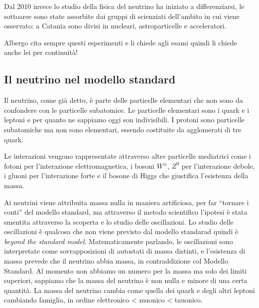         Dal 2010 invece lo studio della fisica del neutrino ha iniziato a differenziarsi, le sottoaree sono state assorbite dai gruppi di scienziati dell'ambito in cui viene osservato: a Catania sono divisi in nucleari, astroparticelle e acceleratori.

        Albergo cita sempre questi esperimenti e li chiede agli esami quindi li chiede anche lei per continuità!
    \subsection{Il neutrino nel modello standard}
        Il neutrino, come già detto, è parte delle particelle elementari che non sono da confondere con le particelle subatomice. Le particelle elementari sono i quark e i leptoni e per quanto ne sappiamo oggi son indivisibili. I protoni sono particelle subatomiche ma non sono elementari, essendo costituite da agglomerati di tre quark.

        Le interazioni vengono rappresentate attraverso altre particelle mediatrici come i fotoni per l'interazione elettromagnetica, i bosoni $W^\pm$, $Z^0$ per l'interazione debole, i gluoni per l'interazione forte e il bosone di Higgs che giustifica l'esistenza della massa.

        Ai neutrini viene attribuita massa nulla in maniera artificiosa, per far ``tornare i conti'' del modello standard, ma attraverso il metodo scientifico l'ipotesi è stata smentita attraverso la scoperta e lo studio delle oscillazioni. Lo studio delle oscillazioni è qualcosa che non viene previsto dal modello standarad quindi è \emph{beyond the standard model}. Matematicamente parlando, le oscillazioni sono interpretate come sovrapposizioni di autostati di massa distinti, e l'esistenza di massa prevede che il neutrino abbia massa, in contraddizione col Modello Standard. Al momento non abbiamo un numero per la massa ma solo dei limiti superiori, sappiamo che la massa del neutrino è non nulla e minore di una certa quantità. La massa del neutrino cambia come quella dei quark e degli altri leptoni cambiando famiglia, in ordine elettronico < muonico < tauonico.

 
